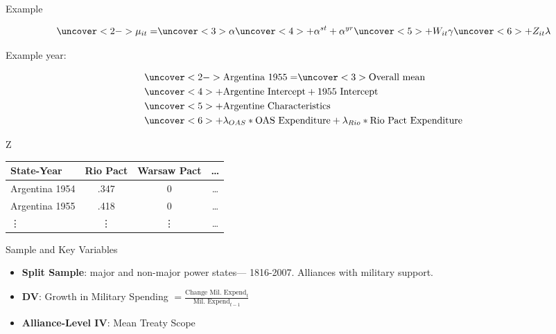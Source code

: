 \documentclass{beamer}
\begin{document}
\begin{frame}{Example}


\begin{equation*}
\uncover<2->{\mu_{it} =} \uncover<3>{\alpha} \uncover<4>{+ \alpha^{st} + \alpha^{yr}} \uncover<5>{+ W_{it} \gamma} \uncover<6>{+ Z_{it} \lambda}
\end{equation*}

Example year: 

\begin{equation*}
\begin{split}
& \uncover<2->{\mbox{Argentina 1955} = } \uncover<3>{\mbox{Overall mean}} \\
& \uncover<4>{+ \mbox{Argentine Intercept} + \mbox{1955 Intercept}} \\
& \uncover<5>{+ \mbox{Argentine Characteristics}} \\
& \uncover<6>{+ \lambda_{OAS} * \mbox{OAS Expenditure} + \lambda_{Rio} * \mbox{Rio Pact Expenditure}}
\end{split}
\end{equation*}



\end{frame}




\begin{frame}[standout]{Z} 

\begin{tabular}{lccc}
State-Year & Rio Pact & Warsaw Pact & \ldots \\
\hline
Argentina 1954 & .347 & 0 & \ldots \\
Argentina 1955 & .418  & 0 & \ldots  \\
 \vdots & \vdots & \vdots & \ldots  
\end{tabular}

 \end{frame}




\begin{frame}{Sample and Key Variables}

\begin{itemize}
\item \textbf{Split Sample}: major and non-major power states--- 1816-2007. Alliances with military support. 
\pause
\item \textbf{DV}: Growth in Military Spending $ = \frac{ \mbox{Change Mil. Expend}_t }{ \mbox{Mil. Expend}_{t-1} }$ 
\pause
\item \textbf{Alliance-Level IV}: Mean Treaty Scope
\end{itemize} 

\end{frame}
\end{document}
